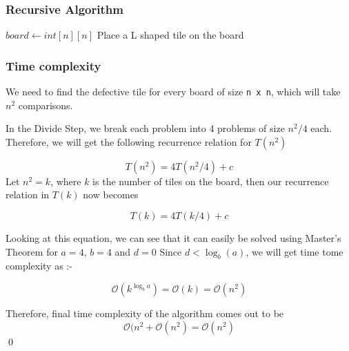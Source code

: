 \documentclass[12pt]{article}
\begin{document}
\subsubsection{Recursive Algorithm}


\begin{algorithm}
\begin{algorithmic}[1]

\Ensure $board \leftarrow int[n][n]$
    \State Place a L shaped tile on the board
\Else

    
\EndIf 
\end{algorithmic}
\end{algorithm}

\pagebreak

\subsubsection{Time complexity}

We need to find the defective tile for every board of size \texttt{n x n}, which will take $n^2$ comparisons.

In the Divide Step, we break each problem into 4 problems of size $n^2/4$ each. Therefore, we will get the following recurrence relation for $T(n^2)$





$$T(n^2) = 4T(n^2/4) + c$$
Let $n^2 = k$, where $k$ is the number of tiles on the board, then our recurrence relation in $T(k)$ now becomes

$$T(k) = 4T(k/4) + c$$


Looking at this equation, we can see that it can easily be solved using Master's Theorem for $a = 4$, $b = 4$ and $d = 0$
Since $d < \log_b(a)$, we will get time tome complexity as  :-

$$\mathcal{O}(k^{\log_b{a}}) = \mathcal{O}(k) = \mathcal{O}(n^2)$$ 

Therefore, final time complexity of the algorithm comes out to be $$\mathcal{O}(n^2 + \mathcal{O}(n^2) = \mathcal{O}(n^2) $$
{\qed}
\end{document}
